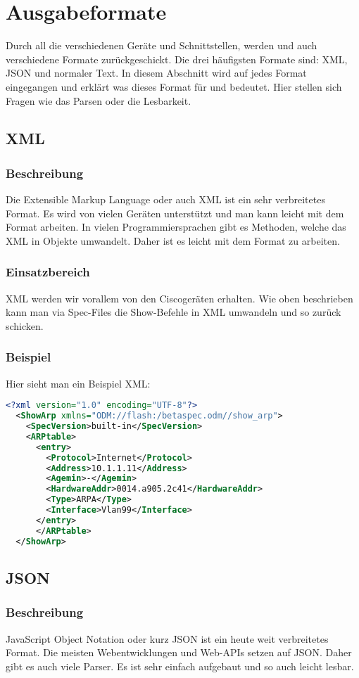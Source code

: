 \documentclass[a4,12pt]{scrartcl}
\begin{document}
\section{Ausgabeformate}
Durch all die verschiedenen Geräte und Schnittstellen, werden und auch verschiedene Formate zurückgeschickt. Die drei häufigsten Formate sind: XML, JSON und normaler Text. In diesem Abschnitt wird auf jedes Format eingegangen und erklärt was dieses Format für und bedeutet. Hier stellen sich Fragen wie das Parsen oder die Lesbarkeit.
\subsection{XML}
\subsubsection{Beschreibung}
Die Extensible Markup Language oder auch XML ist ein sehr verbreitetes Format. Es wird von vielen Geräten unterstützt und man kann leicht mit dem Format arbeiten.
In vielen Programmiersprachen gibt es Methoden, welche das XML in Objekte umwandelt. Daher ist es leicht mit dem Format zu arbeiten.
\subsubsection{Einsatzbereich}
XML werden wir vorallem von den Ciscogeräten erhalten. Wie oben beschrieben kann man via Spec-Files die Show-Befehle in XML umwandeln und so zurück schicken.
\subsubsection{Beispiel}
Hier sieht man ein Beispiel XML:\newline
\begin{lstlisting}[language=xml]
<?xml version="1.0" encoding="UTF-8"?>
  <ShowArp xmlns="ODM://flash:/betaspec.odm//show_arp">
    <SpecVersion>built-in</SpecVersion>
    <ARPtable>
      <entry>
        <Protocol>Internet</Protocol>
        <Address>10.1.1.11</Address>
        <Agemin>-</Agemin>
        <HardwareAddr>0014.a905.2c41</HardwareAddr>
        <Type>ARPA</Type>
        <Interface>Vlan99</Interface>
      </entry>
      </ARPtable>
  </ShowArp>
\end{lstlisting}
\subsection{JSON}
\subsubsection{Beschreibung}
JavaScript Object Notation oder kurz JSON ist ein heute weit verbreitetes Format. Die meisten Webentwicklungen und Web-APIs setzen auf JSON. Daher gibt es auch viele Parser. Es ist sehr einfach aufgebaut und so auch leicht lesbar.
\end{document}
